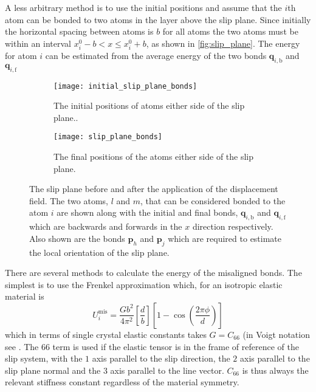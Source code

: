 A less arbitrary method is to use the initial positions and assume that the $i$th atom can be bonded to two atoms in the layer above the slip plane. Since initially the horizontal spacing between atoms is $b$ for all atoms the two atoms must be within an interval $x_i^0 - b < x \leq x_i^0 + b$, as shown in \autoref{fig:slip_plane}. The energy for atom $i$ can be estimated from the average energy of the two bonds $\mathbf{q}_{i,\text{b}}$ and $\mathbf{q}_{i,\text{f}}$

\begin{figure}
\centering
\begin{subfigure}{\textwidth}
\centering
\texttt{[image: initial\_slip\_plane\_bonds]}
\caption{The initial positions of atoms either side of the slip plane.\label{fig:slip_plane_initial_positions}.}
\end{subfigure}
\par\medskip
\begin{subfigure}{\textwidth}
\texttt{[image: slip\_plane\_bonds]}
\caption{The final positions of the atoms either side of the slip plane.\label{fig:slip_plane_final_positions}}
\end{subfigure}
\caption[Misaligned bonds cross the slip plane in a dislocated crystal.]{The slip plane before and after the application of the displacement field. The two atoms, $l$ and $m$, that can be considered bonded to the atom $i$ are shown along with the initial and final bonds, $\mathbf{q}_{i,\text{b}}$ and $\mathbf{q}_{i,\text{f}}$ which are backwards and forwards in the $x$ direction respectively. Also shown are the bonds $\mathbf{p}_h$ and $\mathbf{p}_j$ which are required to estimate the local orientation of the slip plane. \label{fig:slip_plane}}
\end{figure}


There are several methods to calculate the energy of the misaligned bonds. The simplest is to use the Frenkel approximation which, for an isotropic elastic material is 
\begin{equation}
U_i^\text{mis} = \frac{Gb^2}{4\pi^2} \left[\frac{d}{b}\right] \left[ 1 - \cos \left( \frac{2 \pi \phi}{d} \right) \right]
\end{equation}
which in terms of single crystal elastic constants takes $G=C_{66}$ (in Voigt notation see \cite{kelly_knowles2012chapter6_stress_strain}. The $66$ term is used if the elastic tensor is in the frame of reference of  the slip system, with the $1$ axis parallel to the slip direction, the $2$ axis parallel to the slip plane normal and the $3$ axis parallel to the line vector. $C_{66}$ is thus always the relevant stiffness constant regardless of the material symmetry.


